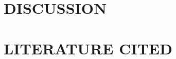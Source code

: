 \documentclass[oneside,12pt, letterpaper]{memoir}
\begin{document}
\chapter{DISCUSSION}
	
 
 \backmatter
 
\OnehalfSpacing

 \chapter{LITERATURE CITED}
	

\SemoSpacing

\semoappendix
 	
\end{document}
